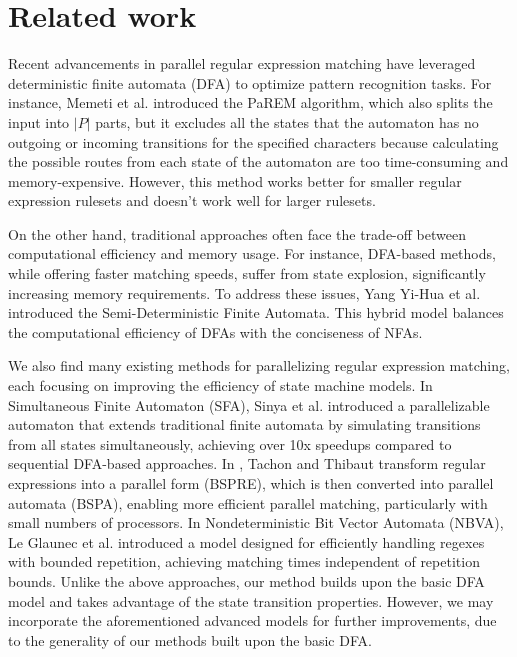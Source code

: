 \documentclass[sigconf]{acmart}
\begin{document}
\section{Related work}
Recent advancements in parallel regular expression matching have leveraged deterministic finite automata (DFA) to optimize pattern recognition tasks. For instance, Memeti et al. \cite{PaREM} introduced the PaREM algorithm, which also splits the input into $|P|$ parts, but it excludes all the states that the automaton has no outgoing or incoming transitions for the specified characters because calculating the possible routes from each state of the automaton are too time-consuming and memory-expensive. However, this method works better for smaller regular expression rulesets and doesn't work well for larger rulesets.

On the other hand, traditional approaches often face the trade-off between computational efficiency and memory usage. For instance, DFA-based methods, while offering faster matching speeds, suffer from state explosion, significantly increasing memory requirements. To address these issues, Yang Yi-Hua et al. \cite{Semi-Deterministic-Finite-Automata} introduced the Semi-Deterministic Finite Automata. This hybrid model balances the computational efficiency of DFAs with the conciseness of NFAs.

We also find many existing methods for parallelizing regular expression matching, each focusing on improving the efficiency of state machine models. In Simultaneous Finite Automaton (SFA)\cite{Simultaneous-Finite-Automaton}, Sinya et al. introduced a parallelizable automaton that extends traditional finite automata by simulating transitions from all states simultaneously, achieving over 10x speedups compared to sequential DFA-based approaches. In \cite{BSP}, Tachon and Thibaut transform regular expressions into a parallel form (BSPRE), which is then converted into parallel automata (BSPA), enabling more efficient parallel matching, particularly with small numbers of processors. In Nondeterministic Bit Vector Automata (NBVA)\cite{NBVA}, Le Glaunec et al. introduced a model designed for efficiently handling regexes with bounded repetition, achieving matching times independent of repetition bounds. Unlike the above approaches, our method builds upon the basic DFA model and takes advantage of the state transition properties. However, we may incorporate the aforementioned advanced models for further improvements, due to the generality of our methods built upon the basic DFA.
\end{document}
